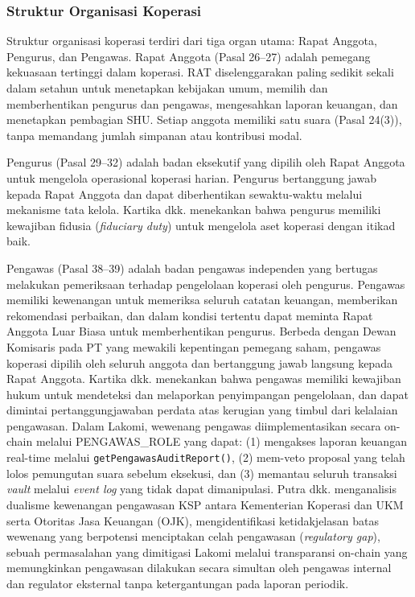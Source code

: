 \subsubsection{Struktur Organisasi Koperasi}

Struktur organisasi koperasi terdiri dari tiga organ utama: Rapat Anggota, Pengurus, dan Pengawas. Rapat Anggota (Pasal 26--27) adalah pemegang kekuasaan tertinggi dalam koperasi. RAT diselenggarakan paling sedikit sekali dalam setahun untuk menetapkan kebijakan umum, memilih dan memberhentikan pengurus dan pengawas, mengesahkan laporan keuangan, dan menetapkan pembagian SHU. Setiap anggota memiliki satu suara (Pasal 24(3)), tanpa memandang jumlah simpanan atau kontribusi modal.

Pengurus (Pasal 29--32) adalah badan eksekutif yang dipilih oleh Rapat Anggota untuk mengelola operasional koperasi harian. Pengurus bertanggung jawab kepada Rapat Anggota dan dapat diberhentikan sewaktu-waktu melalui mekanisme tata kelola. Kartika dkk. \cite{kartika2024tanggung} menekankan bahwa pengurus memiliki kewajiban fidusia (\textit{fiduciary duty}) untuk mengelola aset koperasi dengan itikad baik.

Pengawas (Pasal 38--39) adalah badan pengawas independen yang bertugas melakukan pemeriksaan terhadap pengelolaan koperasi oleh pengurus. Pengawas memiliki kewenangan untuk memeriksa seluruh catatan keuangan, memberikan rekomendasi perbaikan, dan dalam kondisi tertentu dapat meminta Rapat Anggota Luar Biasa untuk memberhentikan pengurus. Berbeda dengan Dewan Komisaris pada PT yang mewakili kepentingan pemegang saham, pengawas koperasi dipilih oleh seluruh anggota dan bertanggung jawab langsung kepada Rapat Anggota. Kartika dkk. \cite{kartika2024tanggung} menekankan bahwa pengawas memiliki kewajiban hukum untuk mendeteksi dan melaporkan penyimpangan pengelolaan, dan dapat dimintai pertanggungjawaban perdata atas kerugian yang timbul dari kelalaian pengawasan. Dalam Lakomi, wewenang pengawas diimplementasikan secara on-chain melalui PENGAWAS\_ROLE yang dapat: (1) mengakses laporan keuangan real-time melalui \texttt{getPengawasAuditReport()}, (2) mem-veto proposal yang telah lolos pemungutan suara sebelum eksekusi, dan (3) memantau seluruh transaksi \textit{vault} melalui \textit{event log} yang tidak dapat dimanipulasi. Putra dkk. \cite{putra2025dualisme} menganalisis dualisme kewenangan pengawasan KSP antara Kementerian Koperasi dan UKM serta Otoritas Jasa Keuangan (OJK), mengidentifikasi ketidakjelasan batas wewenang yang berpotensi menciptakan celah pengawasan (\textit{regulatory gap}), sebuah permasalahan yang dimitigasi Lakomi melalui transparansi on-chain yang memungkinkan pengawasan dilakukan secara simultan oleh pengawas internal dan regulator eksternal tanpa ketergantungan pada laporan periodik.

